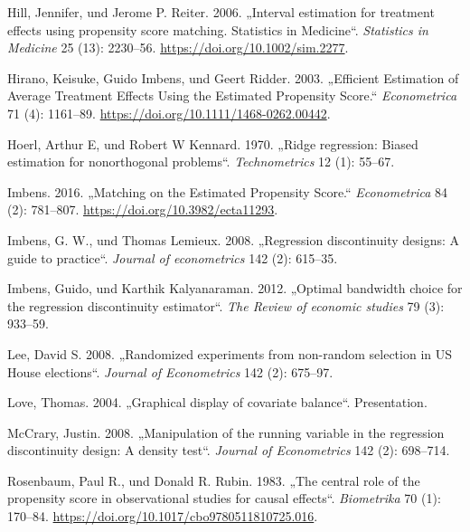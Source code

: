 \documentclass[
  a4paper,
  DIV=11,
  oneside]{scrreprt}
\newlength{\cslhangindent}
\newlength{\cslentryspacingunit} %
\newenvironment{CSLReferences}[2] %
 {%
  \setlength{\parindent}{0pt}
  \ifodd #1
  \let\oldpar\par
  \def\par{\hangindent=\cslhangindent\oldpar}
  \fi
  \setlength{\parskip}{#2\cslentryspacingunit}
 }%
 {}
\begin{document}
\begin{CSLReferences}{1}{0}
\leavevmode{}%
Hill, Jennifer, und Jerome P. Reiter. 2006. {„Interval estimation for
treatment effects using propensity score matching. Statistics in
Medicine``}. \emph{Statistics in Medicine} 25 (13): 2230--56.
\url{https://doi.org/10.1002/sim.2277}.

\leavevmode{}%
Hirano, Keisuke, Guido Imbens, und Geert Ridder. 2003. {„Efficient
Estimation of Average Treatment Effects Using the Estimated Propensity
Score.``} \emph{Econometrica} 71 (4): 1161--89.
\url{https://doi.org/10.1111/1468-0262.00442}.

\leavevmode{}%
Hoerl, Arthur E, und Robert W Kennard. 1970. {„{Ridge regression: Biased
estimation for nonorthogonal problems}``}. \emph{Technometrics} 12 (1):
55--67.

\leavevmode{}%
Imbens. 2016. {„Matching on the Estimated Propensity Score.``}
\emph{Econometrica} 84 (2): 781--807.
\url{https://doi.org/10.3982/ecta11293}.

\leavevmode{}%
Imbens, G. W., und Thomas Lemieux. 2008. {„Regression discontinuity
designs: A guide to practice``}. \emph{Journal of econometrics} 142 (2):
615--35.

\leavevmode{}%
Imbens, Guido, und Karthik Kalyanaraman. 2012. {„Optimal bandwidth
choice for the regression discontinuity estimator``}. \emph{The Review
of economic studies} 79 (3): 933--59.

\leavevmode{}%
Lee, David S. 2008. {„Randomized experiments from non-random selection
in US House elections``}. \emph{Journal of Econometrics} 142 (2):
675--97.

\leavevmode{}%
Love, Thomas. 2004. {„Graphical display of covariate balance``}.
Presentation.

\leavevmode{}%
McCrary, Justin. 2008. {„Manipulation of the running variable in the
regression discontinuity design: A density test``}. \emph{Journal of
Econometrics} 142 (2): 698--714.

\leavevmode{}%
Rosenbaum, Paul R., und Donald R. Rubin. 1983. {„The central role of the
propensity score in observational studies for causal effects``}.
\emph{Biometrika} 70 (1): 170--84.
\url{https://doi.org/10.1017/cbo9780511810725.016}.


\end{CSLReferences}
\end{document}
